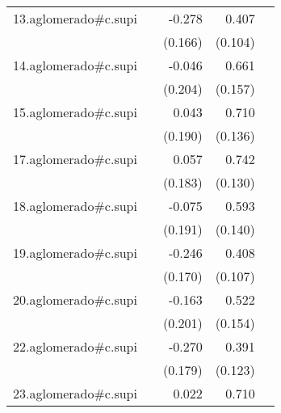{\begin{longtable}{l*{4}{D{.}{.}{-1}}}
\addlinespace
13.aglomerado#c.supi&                     &      -0.278         &       0.407\sym{***}&                     \\
            &                     &     (0.166)         &     (0.104)         &                     \\
\addlinespace
14.aglomerado#c.supi&                     &      -0.046         &       0.661\sym{***}&                     \\
            &                     &     (0.204)         &     (0.157)         &                     \\
\addlinespace
15.aglomerado#c.supi&                     &       0.043         &       0.710\sym{***}&                     \\
            &                     &     (0.190)         &     (0.136)         &                     \\
\addlinespace
17.aglomerado#c.supi&                     &       0.057         &       0.742\sym{***}&                     \\
            &                     &     (0.183)         &     (0.130)         &                     \\
\addlinespace
18.aglomerado#c.supi&                     &      -0.075         &       0.593\sym{***}&                     \\
            &                     &     (0.191)         &     (0.140)         &                     \\
\addlinespace
19.aglomerado#c.supi&                     &      -0.246         &       0.408\sym{***}&                     \\
            &                     &     (0.170)         &     (0.107)         &                     \\
\addlinespace
20.aglomerado#c.supi&                     &      -0.163         &       0.522\sym{***}&                     \\
            &                     &     (0.201)         &     (0.154)         &                     \\
\addlinespace
22.aglomerado#c.supi&                     &      -0.270         &       0.391\sym{**} &                     \\
            &                     &     (0.179)         &     (0.123)         &                     \\
\addlinespace
23.aglomerado#c.supi&                     &       0.022         &       0.710\sym{***}&                     \\

\end{longtable}}
